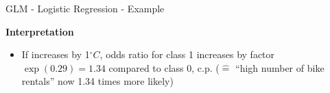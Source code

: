 \documentclass[10pt,compress,t,notes=noshow, xcolor=table]{beamer}
\begin{document}
\begin{frame}{GLM - Logistic Regression - Example}
\bigskip

\textbf{Interpretation}
\begin{itemize}
    \item If  increases by 1$^\circ C$, odds ratio for class 1 increases by factor $\exp (0.29) = 1.34$ compared to class 0, c.p. ($\hat =$ ``high number of bike rentals'' now 1.34 times more likely)
\end{itemize}
\end{frame}









\end{document}

